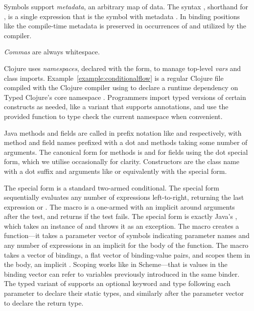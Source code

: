 Symbols support \emph{metadata}, an arbitrary map of
data. The syntax , shorthand for , is a single expression that is the symbol  
with metadata .
In binding positions like 
the compile-time metadata is preserved in occurrences of 
and utilized by the compiler.

\emph{Commas} are always whitespace.

Clojure uses \emph{namespaces}, declared with the
 form, to manage top-level \emph{vars} and
class imports.
Example~\ref{example:conditionalflow}
is a regular Clojure file compiled with
the Clojure compiler using  to declare a
runtime dependency on Typed Clojure's core namespace
.
Programmers import typed versions of certain constructs as needed, like
a  variant that supports annotations,
and use the provided  function to type check the current namespace
when convenient.

Java methods and fields are called in prefix notation
like  and  respectively,
with method and field names prefixed with a dot and methods taking some number of arguments.
The canonical form for methods is  
and for fields  using the dot special form, which we utilise occasionally
for clarity.
Constructors are the class name with a dot suffix and arguments like 
or equivalently  with the  special form.

The  special form is a standard two-armed conditional.
The  special form sequentially evaluates any number of expressions
left-to-right, returning the last expression or \nil{}.
The  macro is a one-armed  with an implicit 
around arguments after the test, and returns  if the test fails.
The  special form is exactly Java's , which takes an
instance of  and throws it as an exception.
The  macro creates a function---it takes a parameter vector of symbols indicating parameter names
and any number of expressions in an implicit  for the body of the function.
The  macro takes a vector of bindings, a flat vector of binding-value pairs,
and scopes them in the body, an implicit .
Scoping works like  in Scheme---that is values in the binding vector can refer
to variables previously introduced in the same binder.
The typed
variant of  supports an optional keyword \clj{:-} and type following
each parameter to declare their static types, and similarly after
the parameter vector to declare the return type.

